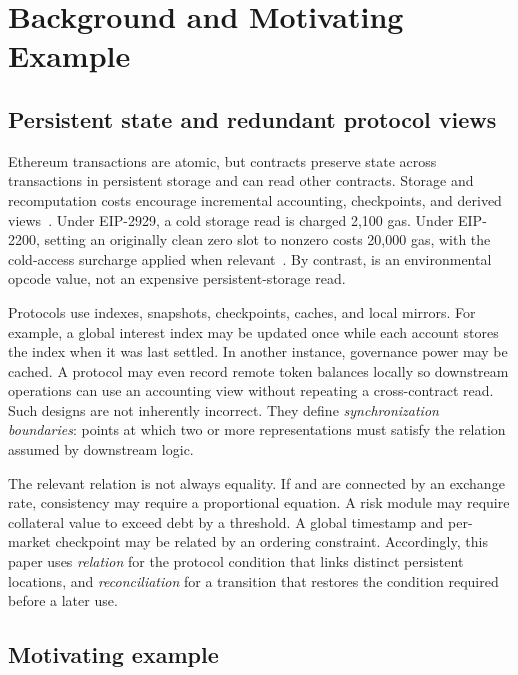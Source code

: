 \section{Background and Motivating Example}
\label{s:background}

\subsection{Persistent state and redundant protocol views}
\label{s:background-state}

Ethereum transactions are atomic, but contracts preserve state across transactions in persistent storage and can read other contracts. Storage and recomputation costs encourage incremental accounting, checkpoints, and derived views~\cite{he2025save}. Under EIP-2929, a cold storage read is charged 2,100 gas. Under EIP-2200, setting an originally clean zero slot to nonzero costs 20,000 gas, with the cold-access surcharge applied when relevant~\cite{eip2929,eip2200}. By contrast,  is an environmental opcode value, not an expensive persistent-storage read.

Protocols use indexes, snapshots, checkpoints, caches, and local mirrors. For example, a global interest index may be updated once while each account stores the index when it was last settled. In another instance, governance power may be cached. A protocol may even record remote token balances locally so downstream operations can use an accounting view without repeating a cross-contract read. Such designs are not inherently incorrect. They define \emph{synchronization boundaries}: points at which two or more representations must satisfy the relation assumed by downstream logic.

The relevant relation is not always equality. If  and  are connected by an exchange rate, consistency may require a proportional equation. A risk module may require collateral value to exceed debt by a threshold. A global timestamp and per-market checkpoint may be related by an ordering constraint. Accordingly, this paper uses \emph{relation} for the protocol condition that links distinct persistent locations, and \emph{reconciliation} for a transition that restores the condition required before a later use.

\subsection{Motivating example}
\label{s:motivating-example}

